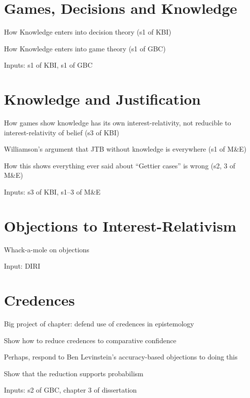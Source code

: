 \documentclass[11pt,oneside]{book}
\begin{document}
\section{Games, Decisions and Knowledge}
\label{gamesdecisionsandknowledge}

\begin{itemize*}
\item How Knowledge enters into decision theory (s1 of KBI)

\item How Knowledge enters into game theory (s1 of GBC)

\end{itemize*}
Inputs: s1 of KBI, s1 of GBC

\section{Knowledge and Justification}
\label{knowledgeandjustification}

\begin{itemize*}
\item How games show knowledge has its own interest-relativity, not reducible to interest-relativity of belief (s3 of KBI)

\item Williamson's argument that JTB without knowledge is everywhere (s1 of M\&E)

\item How this shows everything ever said about ``Gettier cases'' is wrong (s2, 3 of M\&E)

\end{itemize*}
Inputs: s3 of KBI, s1--3 of M\&E

\section{Objections to Interest-Relativism}
\label{objectionstointerest-relativism}

\begin{itemize*}
\item Whack-a-mole on objections

\end{itemize*}
Input: DIRI

\section{Credences}
\label{credences}

\begin{itemize*}
\item Big project of chapter: defend use of credences in epistemology

\item Show how to reduce credences to comparative confidence

\item Perhaps, respond to Ben Levinstein's accuracy-based objections to doing this

\item Show that the reduction supports probabilism

\end{itemize*}
Inputs: s2 of GBC, chapter 3 of dissertation
\end{document}
